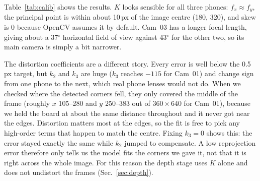Table~\ref{tab:calib} shows the results. $K$ looks sensible for all three phones: $f_x \approx f_y$,
the principal point is within about 10\,px of the image centre (180, 320), and skew is 0 because
OpenCV assumes it by default. Cam~03 has a longer focal length, giving about a 37$^\circ$ horizontal
field of view against 43$^\circ$ for the other two, so its main camera is simply a bit narrower.

The distortion coefficients are a different story. Every error is well below the 0.5\,px target,
but $k_2$ and $k_3$ are huge ($k_3$ reaches $-115$ for Cam~01) and change sign from one phone to
the next, which real phone lenses would not do. When we checked where the detected corners fell, they only covered the middle of the frame
(roughly $x$ 105--280 and $y$ 250--383 out of $360\times640$ for Cam~01), because we held the board
at about the same distance throughout and it never got near the edges. Distortion matters most at the
edges, so the fit is free to pick any high-order terms that happen to match the centre. Fixing
$k_3 = 0$ shows this: the error stayed exactly the same while $k_2$ jumped to compensate. A low
reprojection error therefore only tells us the model fits the corners we gave it, not that it is
right across the whole image. For this reason the depth stage uses $K$ alone and does not undistort
the frames (Sec.~\ref{sec:depth}).

